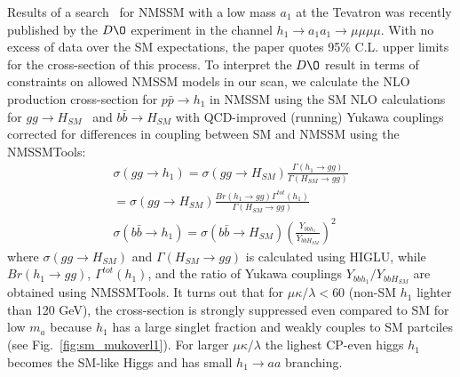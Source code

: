 \documentclass[aps,prl,nofootinbib,superscriptaddress]{revtex4}
\begin{document}
Results of a search~\cite{d0-low-ma} for NMSSM with a low mass $a_1$ at the Tevatron was recently published by the $D\O$ 
experiment in the channel $h_1 \to a_1 a_1 \to \mu \mu \mu \mu$. With no excess of data over the SM expectations, the 
paper quotes 95\% C.L. upper limits for the cross-section of this process. To interpret the $D\O$ result in terms of constraints 
on allowed NMSSM models in our scan, we calculate the NLO production cross-section for $p \bar{p} \to h_1$ in NMSSM using 
the SM NLO calculations for $gg \to H_{SM}$~\cite{Spira:1995rr} and $b\bar{b} \to H_{SM}$ with QCD-improved (running) Yukawa 
couplings~\cite{Balazs:1998sb} corrected for differences in coupling between SM and NMSSM using the NMSSMTools:
\begin{eqnarray}
\sigma(gg\to h_1)=\sigma(gg\to H_{SM})\frac{\Gamma(h_1\to gg)}{\Gamma(H_{SM}\to gg)} \\ \label{eq:ggcross_section}
\nonumber =\sigma(gg\to H_{SM})\frac{Br(h_1\to gg)\Gamma^{tot}(h_1)}{\Gamma(H_{SM}\to gg)} \\
\sigma(b\bar{b}\to h_1)=\sigma(b\bar{b}\to H_{SM})
\left(\frac{Y_{bbh_1}}{Y_{bbH_{SM}}}\right)^2 \label{eq:bbcross_section} 
\end{eqnarray}
where $\sigma(gg\to H_{SM})$ and $\Gamma(H_{SM}\to gg)$ is calculated using
HIGLU, while $Br(h_1\to gg)$, $\Gamma^{tot}(h_1)$, and the ratio of Yukawa couplings 
$Y_{bbh_1}/Y_{bbH_{SM}}$ are obtained using NMSSMTools. It turns out that for $\mu\kappa/\lambda<60$ 
(non-SM $h_1$ lighter than 120 GeV), the cross-section is strongly suppressed even compared to SM 
for low $m_a$ because $h_1$ has a large singlet fraction and weakly couples to SM partciles 
(see Fig.~\ref{fig:sm_mukoverl1}). For larger $\mu\kappa/\lambda$ the lighest 
CP-even higgs $h_1$ becomes the SM-like Higgs and has small $h_1 \to aa$ branching. 
\end{document}
